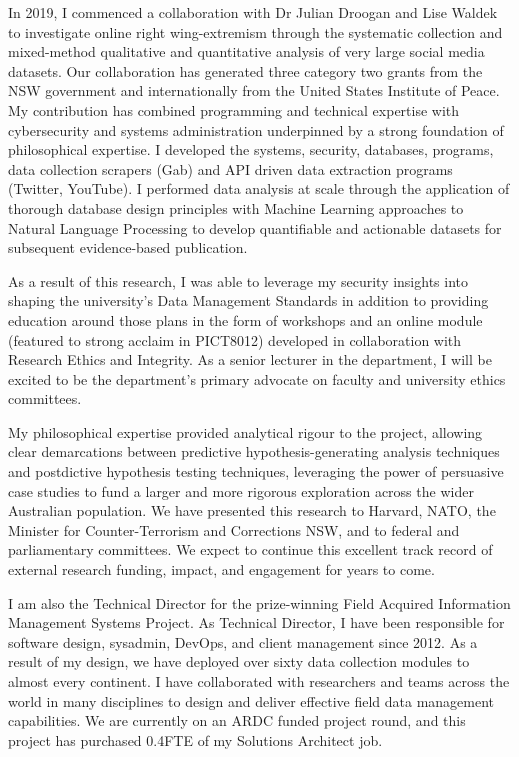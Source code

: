 \documentclass[11pt, a4paper]{awesome-cv}
\begin{document}
\begin{cvletter}
In 2019, I commenced a collaboration with Dr Julian Droogan and Lise Waldek to investigate online right wing-extremism through the systematic collection and mixed-method qualitative and quantitative analysis of very large social media datasets. Our collaboration has generated three category two grants from the NSW government and internationally from the United States Institute of Peace. My contribution has combined programming and technical expertise with cybersecurity and systems administration underpinned by a strong foundation of philosophical expertise. I developed the systems, security, databases, programs, data collection scrapers (Gab) and API driven data extraction programs (Twitter, YouTube). I performed data analysis at scale through the application of thorough database design principles with Machine Learning approaches to Natural Language Processing to develop quantifiable and actionable datasets for subsequent evidence-based publication.

As a result of this research, I was able to leverage my security insights into shaping the university's Data Management Standards in addition to providing education around those plans in the form of workshops and an online module (featured to strong acclaim in PICT8012) developed in collaboration with Research Ethics and Integrity. As a senior lecturer in the department, I will be excited to be the department's primary advocate on faculty and university ethics committees. 

My philosophical expertise provided analytical rigour to the project, allowing clear demarcations between predictive hypothesis-generating analysis techniques and postdictive hypothesis testing techniques, leveraging the power of persuasive case studies to fund a larger and more rigorous exploration across the wider Australian population. We have presented this research to Harvard, NATO, the Minister for Counter-Terrorism and Corrections NSW, and to federal and parliamentary committees. We expect to continue this excellent track record of external research funding, impact, and engagement for years to come.

I am also the Technical Director for the prize-winning Field Acquired Information Management Systems Project. As Technical Director, I have been responsible for software design, sysadmin, DevOps, and client management since 2012. As a result of my design, we have deployed over sixty data collection modules to almost every continent. I have collaborated with researchers and teams across the world in many disciplines to design and deliver effective field data management capabilities. We are currently on an ARDC funded project round, and this project has purchased 0.4FTE of my Solutions Architect job. 


\end{cvletter}
\end{document}
